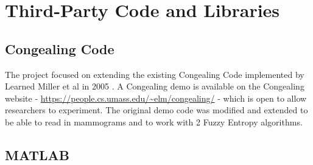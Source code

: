 \chapter{Third-Party Code and Libraries}







\section{Congealing Code}

The project focused on extending the existing Congealing Code implemented by Learned Miller et al in 2005 \cite{Learned-Miller}. A Congealing demo is available on the Congealing website - \url{https://people.cs.umass.edu/~elm/congealing/} - which is open to allow researchers to experiment. The original demo code was modified and extended to be able to read in mammograms and to work with 2 Fuzzy Entropy algorithms.

\section{MATLAB}

